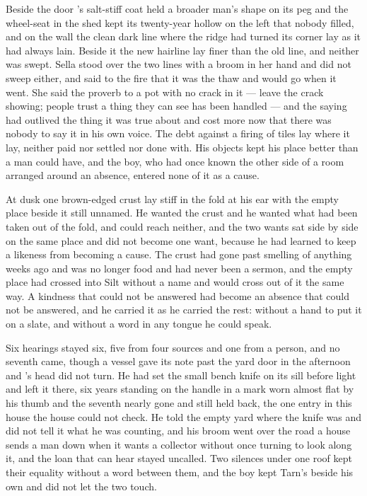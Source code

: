 Beside the door 's salt-stiff coat held a broader man's shape on its peg and the wheel-seat in the shed kept its twenty-year hollow on the left that nobody filled, and on the wall the clean dark line where the  ridge had turned its corner lay as it had always lain. Beside it the new hairline lay finer than the old line, and neither was swept. Sella stood over the two lines with a broom in her hand and did not sweep either, and said to the fire that it was the thaw and would go when it went. She said the proverb to a pot with no crack in it --- leave the crack showing; people trust a thing they can see has been handled --- and the saying had outlived the thing it was true about and cost more now that there was nobody to say it in his own voice. The debt against a firing of tiles lay where it lay, neither paid nor settled nor done with. His objects kept his place better than a man could have, and the boy, who had once known the other side of a room arranged around an absence, entered none of it as a cause.

\scenebreak

At dusk one brown-edged crust lay stiff in the fold at his ear with the empty place beside it still unnamed. He wanted the crust and he wanted what had been taken out of the fold, and could reach neither, and the two wants sat side by side on the same place and did not become one want, because he had learned to keep a likeness from becoming a cause. The crust had gone past smelling of anything weeks ago and was no longer food and had never been a sermon, and the empty place had crossed into Silt without a name and would cross out of it the same way. A kindness that could not be answered had become an absence that could not be answered, and he carried it as he carried the rest: without a hand to put it on a slate, and without a word in any tongue he could speak.

Six hearings stayed six, five from four sources and one from a person, and no seventh came, though a vessel gave its note past the yard door in the afternoon and 's head did not turn. He had set the small bench knife on its sill before light and left it there, six years standing on the handle in a mark worn almost flat by his thumb and the seventh nearly gone and still held back, the one entry in this house the house could not check. He told the empty yard where the knife was and did not tell it what he was counting, and his broom went over the road a house sends a man down when it wants a collector without once turning to look along it, and the loan that can hear stayed uncalled. Two silences under one roof kept their equality without a word between them, and the boy kept Tarn's beside his own and did not let the two touch.

